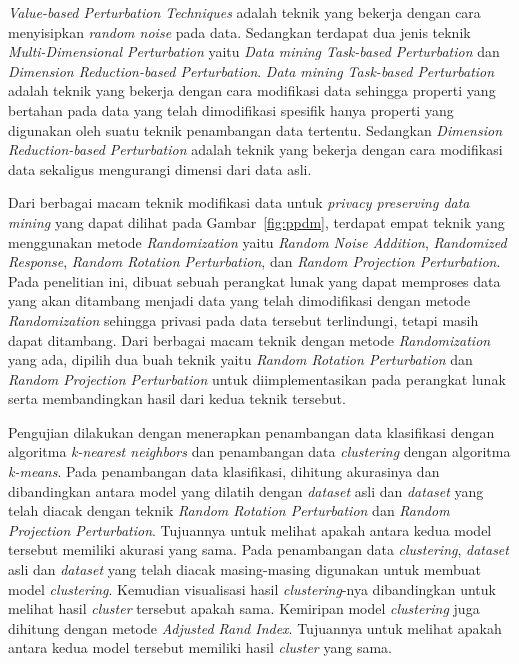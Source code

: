 \textit{Value-based Perturbation Techniques} adalah teknik yang bekerja dengan cara menyisipkan \textit{random noise} pada data. Sedangkan terdapat dua jenis teknik \textit{Multi-Dimensional Perturbation} yaitu \textit{Data mining Task-based Perturbation} dan \textit{Dimension Reduction-based Perturbation}. \textit{Data mining Task-based Perturbation} adalah teknik yang bekerja dengan cara modifikasi data sehingga properti yang bertahan pada data yang telah dimodifikasi spesifik hanya properti yang digunakan oleh suatu teknik penambangan data tertentu. Sedangkan \textit{Dimension Reduction-based Perturbation} adalah teknik yang bekerja dengan cara modifikasi data sekaligus mengurangi dimensi dari data asli.

Dari berbagai macam teknik modifikasi data untuk \textit{privacy preserving data mining} yang dapat dilihat pada Gambar~\ref{fig:ppdm}, terdapat empat teknik yang menggunakan metode \textit{Randomization} yaitu \textit{Random Noise Addition}, \textit{Randomized Response}, \textit{Random Rotation Perturbation}, dan \textit{Random Projection Perturbation}. Pada penelitian ini, dibuat sebuah perangkat lunak yang dapat memproses data yang akan ditambang menjadi data yang telah dimodifikasi dengan metode \textit{Randomization} sehingga privasi pada data tersebut terlindungi, tetapi masih dapat ditambang. Dari berbagai macam teknik dengan metode \textit{Randomization} yang ada, dipilih dua buah teknik yaitu \textit{Random Rotation Perturbation} dan \textit{Random Projection Perturbation} untuk diimplementasikan pada perangkat lunak serta membandingkan hasil dari kedua teknik tersebut.

Pengujian dilakukan dengan menerapkan penambangan data klasifikasi dengan algoritma \textit{k-nearest neighbors} dan penambangan data \textit{clustering} dengan algoritma \textit{k-means}. Pada penambangan data klasifikasi, dihitung akurasinya dan dibandingkan antara model yang dilatih dengan \textit{dataset} asli dan \textit{dataset} yang telah diacak dengan teknik \textit{Random Rotation Perturbation} dan \textit{Random Projection Perturbation}. Tujuannya untuk melihat apakah antara kedua model tersebut memiliki akurasi yang sama. Pada penambangan data \textit{clustering}, \textit{dataset} asli dan \textit{dataset} yang telah diacak masing-masing digunakan untuk membuat model \textit{clustering}. Kemudian visualisasi hasil \textit{clustering}-nya dibandingkan untuk melihat hasil \textit{cluster} tersebut apakah sama. Kemiripan model \textit{clustering} juga dihitung dengan metode \textit{Adjusted Rand Index}. Tujuannya untuk melihat apakah antara kedua model tersebut memiliki hasil \textit{cluster} yang sama.

